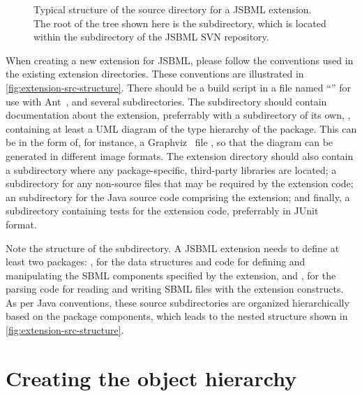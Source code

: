\begin{wrapfigure}[23]{r}{2.05in}
  \vspace*{-3ex}
  \caption{Typical structure of the source directory for a JSBML extension.
    The root of the tree shown here is the  subdirectory,
    which is located within the  subdirectory of the JSBML SVN
    repository.}
  \label{fig:extension-src-structure}
\end{wrapfigure}
When creating a new extension for JSBML, please follow the conventions used
in the existing extension directories.  These conventions are illustrated in
\vref{fig:extension-src-structure}.  There should be a build script in a file
named ``'' for use with Ant~\citep{ApacheAnt}, and several
subdirectories.  The  subdirectory should contain documentation
about the extension, preferrably with a subdirectory of its own, ,
containing at least a UML diagram of the type hierarchy of the package.  This
can be in the form of, for instance, a Graphviz~\cite{graphvizWebsite} file
, so that the diagram can be generated in different
image formats.  The extension directory should also contain a 
subdirectory where any package-specific, third-party libraries are located; a
 subdirectory for any non-source files that may be required
by the extension code; an  subdirectory for the Java source code
comprising the extension; and finally, a  subdirectory containing
tests for the extension code, preferrably in JUnit~\cite{junitWebsite}
format.

Note the structure of the  subdirectory. A JSBML extension needs
to define at least two packages: , for the
data structures and code for defining and manipulating the SBML components
specified by the extension, and , for the
parsing code for reading and writing SBML files with the extension
constructs.  As per Java conventions, these source subdirectories are
organized hierarchically based on the package components, which leads to
the nested structure shown in \vref{fig:extension-src-structure}.


\section{Creating the object hierarchy}


